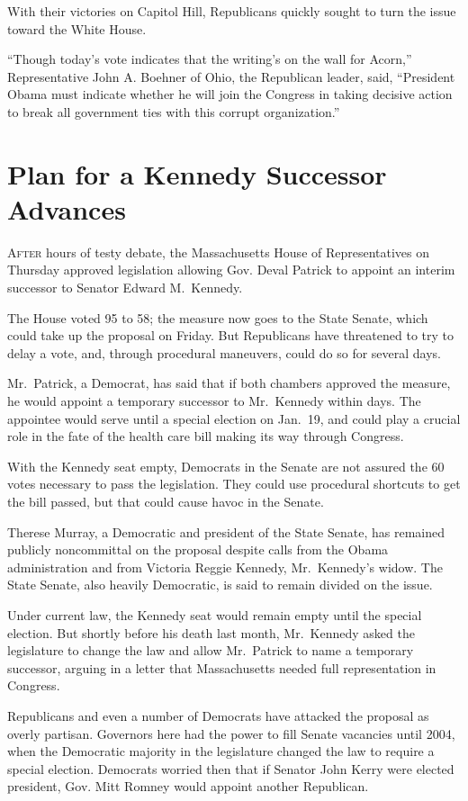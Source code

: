﻿\documentclass[12pt]{article}
\begin{document}
With their victories on Capitol Hill, Republicans quickly sought to turn the issue toward the White
House.

``Though today's vote indicates that the writing's on the wall for Acorn,'' Representative John A.
Boehner of Ohio, the Republican leader, said, ``President Obama must indicate whether he will join
the Congress in taking decisive action to break all government ties with this corrupt
organization.''

\section{Plan for a Kennedy Successor Advances}

\lettrine{A}{fter} hours of testy debate, the Massachusetts House of Representatives on Thursday
approved legislation allowing Gov. Deval Patrick to appoint an interim successor to Senator Edward
M.~Kennedy.

The House voted 95 to 58; the measure now goes to the State Senate, which could take up the proposal
on Friday. But Republicans have threatened to try to delay a vote, and, through procedural
maneuvers\cite{maneuver}, could do so for several days.

Mr.~Patrick, a Democrat, has said that if both chambers approved the measure, he would appoint a
temporary successor to Mr.~Kennedy within days. The appointee would serve until a special election
on Jan.~19, and could play a crucial role in the fate of the health care bill making its way through
Congress.

With the Kennedy seat empty, Democrats in the Senate are not assured the 60 votes necessary to pass
the legislation. They could use procedural shortcuts to get the bill passed, but that could cause
havoc\cite{havoc} in the Senate.

Therese Murray, a Democratic and president of the State Senate, has remained publicly noncommittal
on the proposal despite calls from the Obama administration and from Victoria Reggie Kennedy,
Mr.~Kennedy's widow. The State Senate, also heavily Democratic, is said to remain divided on the
issue.

Under current law, the Kennedy seat would remain empty until the special election. But shortly
before his death last month, Mr.~Kennedy asked the legislature to change the law and allow
Mr.~Patrick to name a temporary successor, arguing in a letter that Massachusetts needed full
representation in Congress.

Republicans and even a number of Democrats have attacked the proposal as overly partisan. Governors
here had the power to fill Senate vacancies until 2004, when the Democratic majority in the
legislature changed the law to require a special election. Democrats worried then that if Senator
John Kerry were elected president, Gov. Mitt Romney would appoint another Republican.
\end{document}
